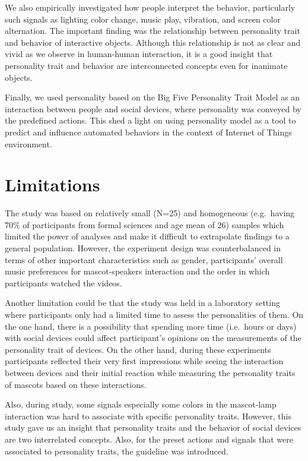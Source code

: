 We also empirically investigated how people interpret the behavior, particularly such
signals as lighting color change, music play, vibration, and screen color alternation.
The important finding was the relationship between personality trait and behavior of interactive objects.
Although this relationship is not as clear and vivid as we observe in human-human interaction,
it is a good insight that personality trait and behavior are interconnected concepts even for inanimate objects.

Finally, we used personality based on the Big Five Personality Trait Model as an interaction
between people and social devices, where personality was conveyed by the predefined actions.
This shed a light on using personality model as a tool to predict and influence automated behaviors
in the context of Internet of Things environment.

\section{Limitations}
\label{sec:limitations}
The study was based on relatively small (N=25) and homogeneous
(e.g.\ having 70\% of participants from formal sciences and age mean of 26) samples which
limited the power of analyses and make it difficult to extrapolate findings to a general population.
However, the experiment design was counterbalanced in terms of other important
characteristics such as gender, participants’ overall music preferences for mascot-speakers
interaction and the order in which participants watched the videos.

Another limitation could be that the study was held in a laboratory setting where
participants only had a limited time to assess the personalities of them.
On the one hand, there is a possibility that spending more time (i.e.\ hours or days)
with social devices could affect participant’s opinions on the measurements of the personality trait of devices.
On the other hand, during these experiments participants reflected their very first impressions
while seeing the interaction between devices and their initial reaction while measuring the
personality traits of mascots based on these interactions.

Also, during study, some signals especially some colors in the mascot-lamp interaction was
hard to associate with specific personality traits.
However, this study gave us an insight that personality traits and the behavior
of social devices are two interrelated concepts.
Also, for the preset actions and signals that were associated to personality traits,
the guideline was introduced.

